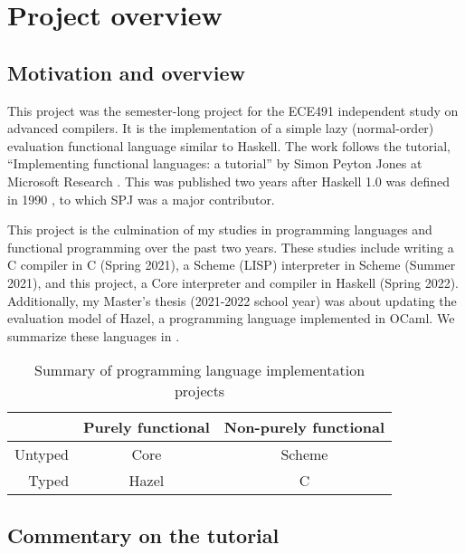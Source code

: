 \section{Project overview}
\label{sec:overview}

\subsection{Motivation and overview}
\label{sec:motivation}

This project was the semester-long project for the ECE491 independent study on advanced compilers. It is the implementation of a simple lazy (normal-order) evaluation functional language similar to Haskell. The work follows the tutorial, ``Implementing functional languages: a tutorial'' by Simon Peyton Jones at Microsoft Research \cite{jones2000implementing}. This was published two years after Haskell 1.0 was defined in 1990 \cite{hudak2007history}, to which SPJ was a major contributor.

This project is the culmination of my studies in programming languages and functional programming over the past two years. These studies include writing a C compiler in C (Spring 2021), a Scheme (LISP) interpreter in Scheme (Summer 2021), and this project, a Core interpreter and compiler in Haskell (Spring 2022). Additionally, my Master's thesis (2021-2022 school year) was about updating the evaluation model of Hazel, a programming language implemented in OCaml. We summarize these languages in .

\begin{table}
  \centering
  \begin{tabular}{r|c|c}
    & Purely functional & Non-purely functional \\
    \hline
    Untyped & Core & Scheme\footnotemark \\
    Typed & Hazel\footnotemark & C\footnotemark
  \end{tabular}
  \caption{Summary of programming language implementation projects}
  \label{tab:pl-implementations-summary}
\end{table}

\addtocounter{footnote}{-2}
\addtocounter{footnote}{1}
\addtocounter{footnote}{1}

\subsection{Commentary on the tutorial}
\label{sec:tutorial-commentary}


